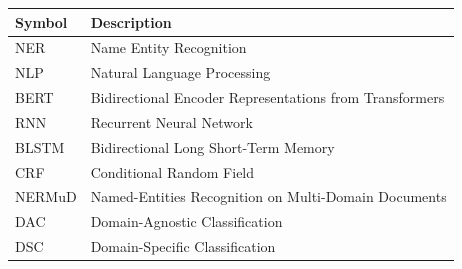 \begin{table}[h!]
\centering
\begin{tabular}{p{3cm} p{11cm}}
\hline
\textbf{Symbol} & \textbf{Description} \\
\hline

NER & Name Entity Recognition \\
NLP & Natural Language Processing \\
BERT & Bidirectional Encoder Representations from Transformers \\
RNN & Recurrent Neural Network \\
BLSTM & Bidirectional Long Short-Term Memory \\
CRF & Conditional Random Field \\
NERMuD & Named-Entities Recognition on Multi-Domain Documents \\
DAC & Domain-Agnostic Classification \\
DSC & Domain-Specific Classification \\

\hline
\end{tabular}
\end{table}